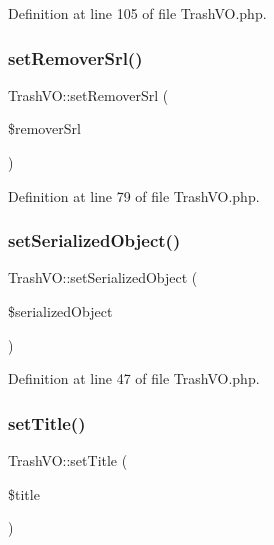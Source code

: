Definition at line 105 of file Trash\+V\+O.\+php.

\hypertarget{classTrashVO_a3bd22cfa2e432561f1fc50dfcdeb4983}{}\label{classTrashVO_a3bd22cfa2e432561f1fc50dfcdeb4983} 
\subsubsection{\texorpdfstring{set\+Remover\+Srl()}{setRemoverSrl()}}
{\footnotesize\ttfamily Trash\+V\+O\+::set\+Remover\+Srl (\begin{DoxyParamCaption}\item[{}]{\$remover\+Srl }\end{DoxyParamCaption})}



Definition at line 79 of file Trash\+V\+O.\+php.

\hypertarget{classTrashVO_a823a0ca9280c9ef91a997fc3e4c3b8ab}{}\label{classTrashVO_a823a0ca9280c9ef91a997fc3e4c3b8ab} 
\subsubsection{\texorpdfstring{set\+Serialized\+Object()}{setSerializedObject()}}
{\footnotesize\ttfamily Trash\+V\+O\+::set\+Serialized\+Object (\begin{DoxyParamCaption}\item[{}]{\$serialized\+Object }\end{DoxyParamCaption})}



Definition at line 47 of file Trash\+V\+O.\+php.

\hypertarget{classTrashVO_a39f7c05ef0c9d43122b220969f70b215}{}\label{classTrashVO_a39f7c05ef0c9d43122b220969f70b215} 
\subsubsection{\texorpdfstring{set\+Title()}{setTitle()}}
{\footnotesize\ttfamily Trash\+V\+O\+::set\+Title (\begin{DoxyParamCaption}\item[{}]{\$title }\end{DoxyParamCaption})}



